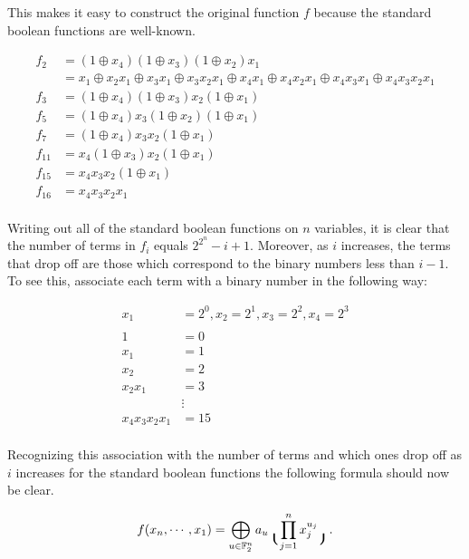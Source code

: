 \\
\\
\par This makes it easy to construct the original function $f$ because
the standard boolean functions are well-known.

\begin{align*}
  f_2   &=(1\oplus x_4)(1\oplus x_3)(1\oplus x_2)x_1\\
        &=x_1 \oplus x_2x_1 \oplus x_3x_1 \oplus x_3x_2x_1 \oplus x_4x_1 \oplus x_4x_2x_1
        \oplus x_4x_3x_1 \oplus x_4x_3x_2x_1\\
  f_3   &=(1\oplus x_4)(1\oplus x_3)x_2(1\oplus x_1)\\
  f_5   &=(1\oplus x_4)x_3(1\oplus x_2)(1\oplus x_1)\\
  f_7   &=(1\oplus x_4)x_3x_2(1\oplus x_1)\\
  f_{11}&=x_4(1\oplus x_3)x_2(1\oplus x_1)\\
  f_{15}&=x_4x_3x_2(1\oplus x_1)\\
  f_{16}&=x_4x_3x_2x_1\\
\end{align*}

\par Writing out all of the standard boolean functions on $n$ variables, it is clear that
the number of terms in $f_i$ equals $2^{2^{n}}-i+1$. Moreover, as $i$ increases, the terms that
drop off are those which correspond to the binary numbers less than $i-1$. To see this, associate
each term with a binary number in the following way:

\begin{align*}
  x_1&=2^0 , x_2=2^1 , x_3=2^2 , x_4=2^3 \\
  \\
  1&=0\\
  x_1&=1\\
  x_2&=2\\
  x_2x_1&=3\\
  &\vdots\\
  x_4x_3x_2x_1&=15\\
\end{align*}

\par Recognizing this association with the number of terms and which ones drop off as
$i$ increases for the standard boolean functions the following formula should now be clear.

\begin{equation}
  f(x_n,\cdots,x_1)=\bigoplus_{u\in\mathbb{F}_2^n}a_u\lgroup\prod_{j=1}^nx_j^{u_j}\rgroup.
\end{equation}
  

